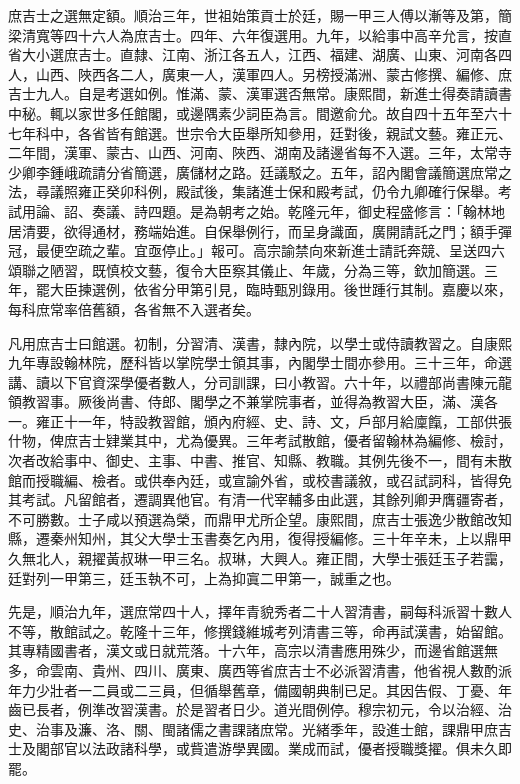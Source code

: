 \begin{pinyinscope}
庶吉士之選無定額。順治三年，世祖始策貢士於廷，賜一甲三人傅以漸等及第，簡梁清寬等四十六人為庶吉士。四年、六年復選用。九年，以給事中高辛允言，按直省大小選庶吉士。直隸、江南、浙江各五人，江西、福建、湖廣、山東、河南各四人，山西、陜西各二人，廣東一人，漢軍四人。另榜授滿洲、蒙古修撰、編修、庶吉士九人。自是考選如例。惟滿、蒙、漢軍選否無常。康熙間，新進士得奏請讀書中秘。輒以家世多任館閣，或邊隅素少詞臣為言。間邀俞允。故自四十五年至六十七年科中，各省皆有館選。世宗令大臣舉所知參用，廷對後，親試文藝。雍正元、二年間，漢軍、蒙古、山西、河南、陜西、湖南及諸邊省每不入選。三年，太常寺少卿李鍾峨疏請分省簡選，廣儲材之路。廷議駁之。五年，詔內閣會議簡選庶常之法，尋議照雍正癸卯科例，殿試後，集諸進士保和殿考試，仍令九卿確行保舉。考試用論、詔、奏議、詩四題。是為朝考之始。乾隆元年，御史程盛修言：「翰林地居清要，欲得通材，務端始進。自保舉例行，而呈身識面，廣開請託之門；額手彈冠，最便空疏之輩。宜亟停止。」報可。高宗諭禁向來新進士請託奔競、呈送四六頌聯之陋習，既慎校文藝，復令大臣察其儀止、年歲，分為三等，欽加簡選。三年，罷大臣揀選例，依省分甲第引見，臨時甄別錄用。後世踵行其制。嘉慶以來，每科庶常率倍舊額，各省無不入選者矣。

凡用庶吉士曰館選。初制，分習清、漢書，隸內院，以學士或侍讀教習之。自康熙九年專設翰林院，歷科皆以掌院學士領其事，內閣學士間亦參用。三十三年，命選講、讀以下官資深學優者數人，分司訓課，曰小教習。六十年，以禮部尚書陳元龍領教習事。厥後尚書、侍郎、閣學之不兼掌院事者，並得為教習大臣，滿、漢各一。雍正十一年，特設教習館，頒內府經、史、詩、文，戶部月給廩餼，工部供張什物，俾庶吉士肄業其中，尤為優異。三年考試散館，優者留翰林為編修、檢討，次者改給事中、御史、主事、中書、推官、知縣、教職。其例先後不一，間有未散館而授職編、檢者。或供奉內廷，或宣諭外省，或校書議敘，或召試詞科，皆得免其考試。凡留館者，遷調異他官。有清一代宰輔多由此選，其餘列卿尹膺疆寄者，不可勝數。士子咸以預選為榮，而鼎甲尤所企望。康熙間，庶吉士張逸少散館改知縣，遷秦州知州，其父大學士玉書奏乞內用，復得授編修。三十年辛未，上以鼎甲久無北人，親擢黃叔琳一甲三名。叔琳，大興人。雍正間，大學士張廷玉子若靄，廷對列一甲第三，廷玉執不可，上為抑寘二甲第一，誠重之也。

先是，順治九年，選庶常四十人，擇年青貌秀者二十人習清書，嗣每科派習十數人不等，散館試之。乾隆十三年，修撰錢維城考列清書三等，命再試漢書，始留館。其專精國書者，漢文或日就荒落。十六年，高宗以清書應用殊少，而邊省館選無多，命雲南、貴州、四川、廣東、廣西等省庶吉士不必派習清書，他省視人數酌派年力少壯者一二員或二三員，但循舉舊章，備國朝典制已足。其因告假、丁憂、年齒已長者，例準改習漢書。於是習者日少。道光間例停。穆宗初元，令以治經、治史、治事及濂、洛、關、閩諸儒之書課諸庶常。光緒季年，設進士館，課鼎甲庶吉士及閣部官以法政諸科學，或貲遣游學異國。業成而試，優者授職獎擢。俱未久即罷。


\end{pinyinscope}
